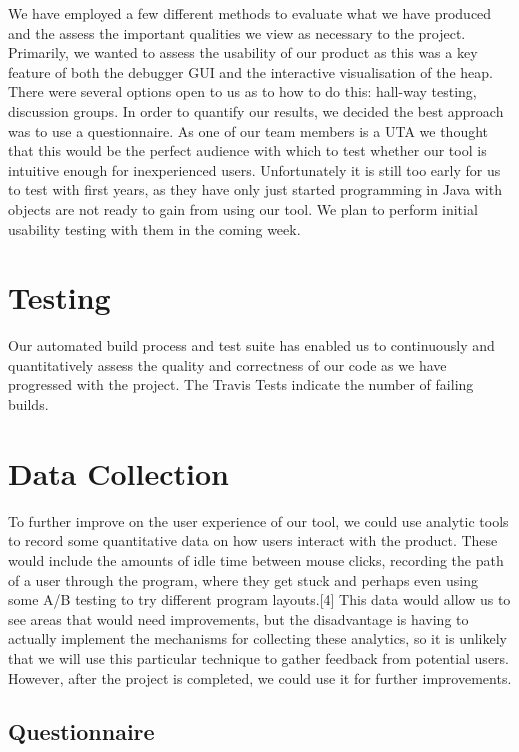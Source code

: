 \documentclass[10pt, a4paper]{article}
\begin{document}
We have employed a few different methods to evaluate what we have produced and the assess the important qualities we view as necessary to the project. Primarily, we wanted to assess the usability of our product as this was a key feature of both the debugger GUI and the interactive visualisation of the heap. There were several options open to us as to how to do this: hall-way testing, discussion groups. In order to quantify our results, we decided the best approach was to use a questionnaire. As one of our team members is a UTA we thought that this would be the perfect audience with which to test whether our tool is intuitive enough for inexperienced users. Unfortunately it is still too early for us to test with first years, as they have only just started programming in Java with objects are not ready to gain from using our tool. We plan to perform initial usability testing with them in the coming week.

\section{Testing}
Our automated build process and test suite has enabled us to continuously and quantitatively assess the quality and correctness of our code as we have progressed with the project. The Travis Tests indicate the number of failing builds.

\section{Data Collection}
To further improve on the user experience of our tool, we could use analytic tools to record some quantitative data on how users interact with the product. These would include the amounts of idle time between mouse clicks, recording the path of a user through the program, where they get stuck and perhaps even using some A/B testing to try different program layouts.[4] This data would allow us to see areas that would need improvements, but the disadvantage is having to actually implement the mechanisms for collecting these analytics, so it is unlikely that we will use this particular technique to gather feedback from potential users. However, after the project is completed, we could use it for further improvements. 

\subsection{Questionnaire}
\end{document}
